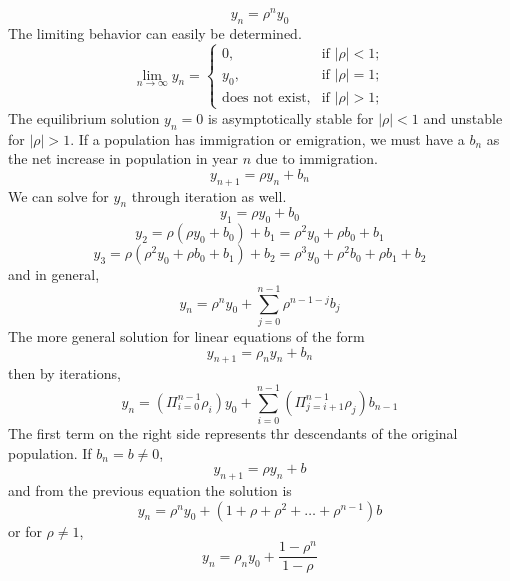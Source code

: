     \begin{equation*}
        y_n = \rho^ny_0
    \end{equation*}
    The limiting behavior can easily be determined.
    \begin{equation*}
        \lim_{n \rightarrow \infty} y_n = \begin{cases}
            0, & \text{if } |\rho| < 1; \\
            y_0, & \text{if } |\rho| = 1; \\
            \text{does not exist}, & \text{if } |\rho| > 1;
        \end{cases}
    \end{equation*}
    The equilibrium solution $y_n = 0$ is asymptotically stable for $|\rho| < 1$ and unstable for $|\rho| > 1$.
    \newline\indent
    If a population has immigration or emigration, we must have a $b_n$ as the net increase in population in year $n$ due to immigration.
    \begin{equation*}
        y_{n+1} = \rho y_n + b_n 
    \end{equation*}
    We can solve for $y_n$ through iteration as well.
    $$ y_1 = \rho y_0 + b_0 $$
    $$ y_2 = \rho(\rho y_0 + b_0) + b_1 = \rho^2y_0 + \rho b_0 + b_1 $$
    $$ y_3 = \rho(\rho^2y_0 + \rho b_0 + b_1) + b_2 = \rho^3 y_0 + \rho^2 b_0 + \rho b_1 + b_2 $$
    and in general,
    $$ y_n = \rho^n y_0 + \sum_{j = 0}^{n-1} \rho^{n-1-j} b_j $$
    The more general solution for linear equations of the form
    \begin{equation*}
        y_{n+1} = \rho_n y_n + b_n
    \end{equation*}
    then by iterations,
    \begin{equation*}
        y_n = (\Pi_{i=0}^{n-1} \rho_i) y_0 + \sum_{i=0}^{n-1} (\Pi_{j = i + 1}^{n - 1} \rho_j) b_{n-1}
    \end{equation*}
    The first term on the right side represents thr descendants of the original population.
    \newline \indent
    If $b_n = b \neq 0$,
    $$y_{n+1} = \rho y_n + b$$
    and from the previous equation the solution is
    \begin{equation*}
        y_n = \rho^ny_0 + (1 + \rho + \rho^2 + \dots + \rho^{n-1})b
    \end{equation*}
    or for $\rho \neq 1$,
    \begin{equation*}
        y_n = \rho_n y_0 + \frac{1 - \rho^n}{1 - \rho}
    \end{equation*}
